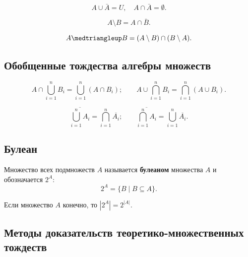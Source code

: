 \begin{property}
    \[
        A \cup \bar{A} = U,
        \quad
        A \cap \bar{A} = \emptyset.
    \]
\end{property}

\begin{property}
    \[
        A \setminus B = A \cap \bar{B}.
    \]
\end{property}

\begin{property}
    \[
        A \symdiff B = (A \setminus B) \cap (B \setminus A).
    \]
\end{property}

\subsection{Обобщенные тождества алгебры множеств}

\begin{property}
    \[
        A \cap \bigcup_{i = 1}^n B_i = \bigcup_{i = 1}^n (A \cap B_i);
        \qquad
        A \cup \bigcap_{i = 1}^n B_i = \bigcap_{i = 1}^n (A \cup B_i).
    \]
\end{property}

\begin{property}
    \[
        \overline{\bigcup_{i = 1}^n A_i} = \bigcap_{i = 1}^n \overline{A_i};
        \qquad
        \overline{\bigcap_{i = 1}^n A_i} = \bigcup_{i = 1}^n \overline{A_i}.
    \]
\end{property}

\subsection{Булеан}

Множество всех подмножеств \(A\) называется \textbf{булеаном} множества \(A\) и обозначается \(2^A\):
\[
    2^A = \{B \mid B \subseteq A\}.
\]

\begin{theorem*}
    Если множество \(A\) конечно, то \(|2^A| = 2^{|A|}\).
\end{theorem*}

\subsection{Методы доказательств теоретико-множественных тождеств}

